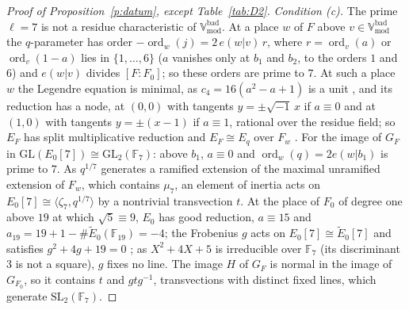 \documentclass[11pt]{amsart}
\theoremstyle{remark}
\newcommand{\F}{\mathbb F}
\newcommand{\Vbadmod}{\mathbb V^{\mathrm{bad}}_{\mathrm{mod}}}
\begin{document}
\begin{proof}[Proof of Proposition~\ref{p:datum}, except Table~\ref{tab:D2}]
\emph{Condition (c).} The prime $\ell=7$ is not a residue characteristic of $\Vbadmod$. At a place $w$ of $F$ above
$v\in\Vbadmod$ the $q$-parameter has order $-\operatorname{ord}_w(j)=2\,e(w|v)\,r$, where
$r=\operatorname{ord}_v(a)$ or $\operatorname{ord}_v(1-a)$ lies in $\{1,\dots,6\}$ ($a$ vanishes only at $b_1$ and
$b_2$, to the orders $1$ and $6$) and $e(w|v)$ divides $[F:F_0]$; so these orders are prime to $7$. At such a
place $w$ the Legendre equation is minimal, as $c_4=16(a^2-a+1)$ is a unit \cite[\S VII.1]{Sil}, and its reduction
has a node, at $(0,0)$ with tangents $y=\pm\sqrt{-1}\,x$ if $a\equiv0$ and at $(1,0)$ with tangents $y=\pm(x-1)$ if
$a\equiv1$, rational over the residue field; so $E_F$ has split multiplicative reduction and $E_F\cong E_q$ over
$F_w$ \cite[App.~C, Thm.~14.1]{Sil}. For the image of $G_F$ in $\mathrm{GL}(E_0[7])\cong\mathrm{GL}_2(\F_7)$: above
$b_1$, $a\equiv0$ and $\operatorname{ord}_w(q)=2e(w|b_1)$ is prime to $7$. As
$q^{1/7}$ generates a ramified extension of the maximal unramified extension of $F_w$, which contains $\mu_7$, an
element of inertia acts on $E_0[7]\cong\langle\zeta_7,q^{1/7}\rangle$ by a nontrivial transvection $t$. At the
place of $F_0$ of degree one above $19$ at which $\sqrt5\equiv9$, $E_0$ has good reduction, $a\equiv15$ and
$a_{19}=19+1-\#\tilde E_0(\F_{19})=-4$; the Frobenius $g$ acts on $E_0[7]\cong\tilde E_0[7]$
\cite[Prop.~VII.3.1]{Sil} and satisfies $g^2+4g+19=0$ \cite[Thm.~V.2.3.1]{Sil}; as $X^2+4X+5$ is irreducible over
$\F_7$ (its discriminant $3$ is not a square), $g$ fixes no line. The image $H$ of $G_F$ is normal in the image of
$G_{F_0}$, so it contains $t$ and $gtg^{-1}$, transvections with distinct fixed lines, which generate
$\mathrm{SL}_2(\F_7)$.


\end{proof}
\end{document}
